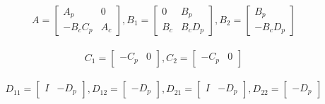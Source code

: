 \documentclass[a4paper,12pt]{article}
\begin{document}
				\[
				A =
				\begin{bmatrix}
				A_{p} & 0 \\ -B_{c}C_{p} & A_{c}	
				\end{bmatrix}
				,B_{1}=
				\begin{bmatrix}
				0 & B_{p} \\ B_{c} & B_{c}D_{p} 
				\end{bmatrix}	
				,B_{2}=
				\begin{bmatrix}
				B_{p} \\ -B_{c}D_{p} 
				\end{bmatrix}	
				\]
				\\
				\[
				C_{1}=
				\begin{bmatrix}
				-C_{p} & 0
				\end{bmatrix}	
				,C_{2}=
				\begin{bmatrix}
				-C_{p} & 0
				\end{bmatrix}	
				\]	
				\\
				\[
				D_{11}=
				\begin{bmatrix}
				I & -D_{p}
				\end{bmatrix}					
				,D_{12}=
				\begin{bmatrix}
				-D_{p}
				\end{bmatrix}	
				,D_{21}=
				\begin{bmatrix}
				I & -D_{p}
				\end{bmatrix}	
				,D_{22}=
				\begin{bmatrix}
				-D_{p}
				\end{bmatrix}	
				\]
										
\end{document}
